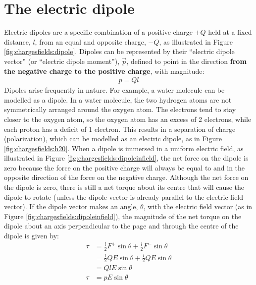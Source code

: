 \section{The electric dipole}
\label{sec:chargesfields:electricdipole}
Electric dipoles are a specific combination of a positive charge $+Q$ held at a fixed distance, $l$, from an equal and opposite charge, $-Q$, as illustrated in Figure \ref{fig:chargesfields:dipole}.
Dipoles can be represented by their ``electric dipole vector'' (or ``electric dipole moment''), $\vec p$, defined to point in the direction \textbf{from the negative charge to the positive charge}, with magnitude:
\begin{align*}
p=Ql
\end{align*}
Dipoles arise frequently in nature. For example, a water molecule can be modelled as a dipole. In a water molecule, the two hydrogen atoms are not symmetrically arranged around the oxygen atom. The electrons tend to stay closer to the oxygen atom, so the oxygen atom has an excess of 2 electrons, while each proton has a deficit of 1 electron. This results in a separation of charge (polarization), which can be modelled as an electric dipole, as in Figure \ref{fig:chargesfields:h20}.
When a dipole is immersed in a uniform electric field, as illustrated in Figure \ref{fig:chargesfields:dipoleinfield}, the net force on the dipole is zero because the force on the positive charge will always be equal to and in the opposite direction of the force on the negative charge. 
Although the net force on the dipole is zero, there is still a net torque about its centre that will cause the dipole to rotate (unless the dipole vector is already parallel to the electric field vector). If the dipole vector makes an angle, $\theta$, with the electric field vector (as in Figure \ref{fig:chargesfields:dipoleinfield}), the magnitude of the net torque on the dipole about an axis perpendicular to the page and through the centre of the dipole is given by:
\begin{align*}
\tau&=\frac{l}{2}F^+\sin\theta+\frac{l}{2}F^-\sin\theta\\
&=\frac{l}{2}QE\sin\theta+\frac{l}{2}QE\sin\theta\\
&=QlE\sin\theta\\
\tau&=pE\sin\theta
\end{align*}
